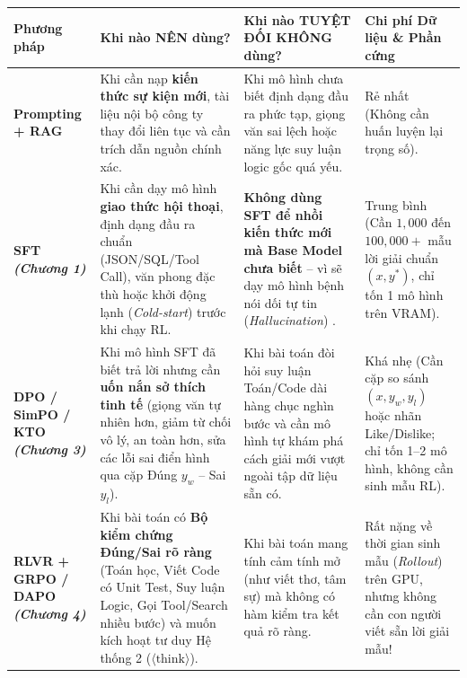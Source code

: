 \documentclass[11pt,a4paper,oneside]{report}
\theoremstyle{definition}
\begin{document}
\begin{table}[h!]
\centering
\small
\renewcommand{\arraystretch}{1.38}
\begin{tabularx}{\textwidth}{>{\bfseries}p{2.7cm} p{3.6cm} X p{3.4cm}}
\toprule
Phương pháp & Khi nào NÊN dùng? & Khi nào TUYỆT ĐỐI KHÔNG dùng? & Chi phí Dữ liệu \& Phần cứng \\
\midrule
Prompting + RAG \newline \citep{ovadia2024fine} & Khi cần nạp \textbf{kiến thức sự kiện mới}, tài liệu nội bộ công ty thay đổi liên tục và cần trích dẫn nguồn chính xác. & Khi mô hình chưa biết định dạng đầu ra phức tạp, giọng văn sai lệch hoặc năng lực suy luận logic gốc quá yếu. & Rẻ nhất (Không cần huấn luyện lại trọng số). \\
\midrule
SFT \newline \textit{(Chương 1)} \newline \citep{zhou2023lima, dubey2024llama} & Khi cần dạy mô hình \textbf{giao thức hội thoại}, định dạng đầu ra chuẩn (JSON/SQL/Tool Call), văn phong đặc thù hoặc khởi động lạnh (\textit{Cold-start}) trước khi chạy RL. & \textbf{Không dùng SFT để nhồi kiến thức mới mà Base Model chưa biết} -- vì sẽ dạy mô hình bệnh nói dối tự tin (\textit{Hallucination}) \citep{gekhman2024does}. & Trung bình (Cần $1,000$ đến $100,000+$ mẫu lời giải chuẩn $(x, y^*)$, chỉ tốn 1 mô hình trên VRAM). \\
\midrule
DPO / SimPO / KTO \newline \textit{(Chương 3)} \newline \citep{rafailov2023direct, meng2024simpo} & Khi mô hình SFT đã biết trả lời nhưng cần \textbf{uốn nắn sở thích tinh tế} (giọng văn tự nhiên hơn, giảm từ chối vô lý, an toàn hơn, sửa các lỗi sai điển hình qua cặp Đúng $y_w$ -- Sai $y_l$). & Khi bài toán đòi hỏi suy luận Toán/Code dài hàng chục nghìn bước và cần mô hình tự khám phá cách giải mới vượt ngoài tập dữ liệu sẵn có. & Khá nhẹ (Cần cặp so sánh $(x, y_w, y_l)$ hoặc nhãn Like/Dislike; chỉ tốn 1--2 mô hình, không cần sinh mẫu RL). \\
\midrule
RLVR + GRPO / DAPO \newline \textit{(Chương 4)} \newline \citep{shao2024deepseekmath, deepseek2025r1, yu2025dapo} & Khi bài toán có \textbf{Bộ kiểm chứng Đúng/Sai rõ ràng} (Toán học, Viết Code có Unit Test, Suy luận Logic, Gọi Tool/Search nhiều bước) và muốn kích hoạt tư duy Hệ thống 2 ($\langle\text{think}\rangle$). & Khi bài toán mang tính cảm tính mở (như viết thơ, tâm sự) mà không có hàm kiểm tra kết quả rõ ràng. & Rất nặng về thời gian sinh mẫu (\textit{Rollout}) trên GPU, nhưng không cần con người viết sẵn lời giải mẫu! \\

\end{tabularx}
\end{table}
\end{document}
